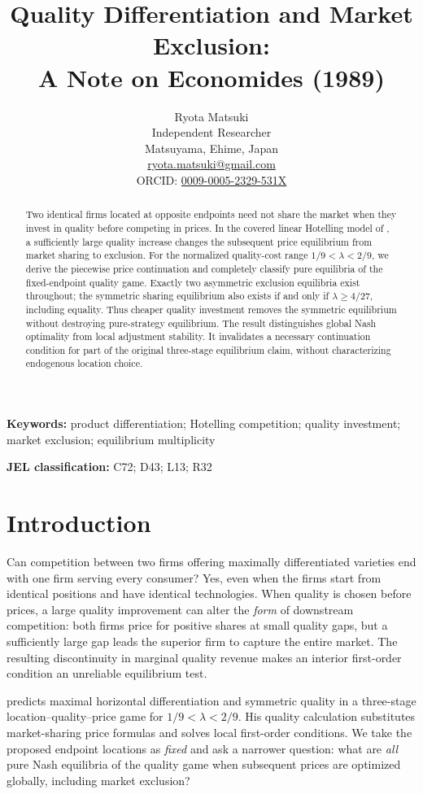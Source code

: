 \documentclass[11pt]{article}
\title{Quality Differentiation and Market Exclusion:\\A Note on Economides (1989)}
\author{Ryota Matsuki\\Independent Researcher\\Matsuyama, Ehime, Japan\\\href{mailto:ryota.matsuki@gmail.com}{ryota.matsuki@gmail.com}\\ORCID: \href{https://orcid.org/0009-0005-2329-531X}{0009-0005-2329-531X}}
\date{}
\begin{document}
\maketitle
\begin{abstract}
Two identical firms located at opposite endpoints need not share the market when they invest in quality before competing in prices. In the covered linear Hotelling model of \citet{Economides1989}, a sufficiently large quality increase changes the subsequent price equilibrium from market sharing to exclusion. For the normalized quality-cost range $1/9<\lambda<2/9$, we derive the piecewise price continuation and completely classify pure equilibria of the fixed-endpoint quality game. Exactly two asymmetric exclusion equilibria exist throughout; the symmetric sharing equilibrium also exists if and only if $\lambda\geq4/27$, including equality. Thus cheaper quality investment removes the symmetric equilibrium without destroying pure-strategy equilibrium. The result distinguishes global Nash optimality from local adjustment stability. It invalidates a necessary continuation condition for part of the original three-stage equilibrium claim, without characterizing endogenous location choice.
\end{abstract}
\noindent\textbf{Keywords:} product differentiation; Hotelling competition; quality investment; market exclusion; equilibrium multiplicity\par
\medskip
\noindent\textbf{JEL classification:} C72; D43; L13; R32

\section{Introduction}\label{sec:intro}
Can competition between two firms offering maximally differentiated varieties end with one firm serving every consumer? Yes, even when the firms start from identical positions and have identical technologies. When quality is chosen before prices, a large quality improvement can alter the \emph{form} of downstream competition: both firms price for positive shares at small quality gaps, but a sufficiently large gap leads the superior firm to capture the entire market. The resulting discontinuity in marginal quality revenue makes an interior first-order condition an unreliable equilibrium test.

\citet[Theorem~2, pp.~27--28]{Economides1989} predicts maximal horizontal differentiation and symmetric quality in a three-stage location--quality--price game for $1/9<\lambda<2/9$. His quality calculation substitutes market-sharing price formulas and solves local first-order conditions. We take the proposed endpoint locations as \emph{fixed} and ask a narrower question: what are \emph{all} pure Nash equilibria of the quality game when subsequent prices are optimized globally, including market exclusion?
\end{document}
